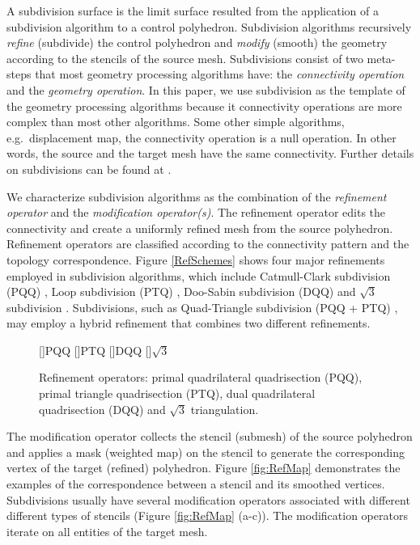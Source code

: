 A subdivision surface is the limit surface resulted from the
application of a subdivision algorithm to a control polyhedron.
Subdivision algorithms recursively \emph{refine} (subdivide) the
control polyhedron and \emph{modify} (smooth) the geometry according
to the stencils of the source mesh.  Subdivisions consist of two
meta-steps that most geometry processing algorithms have: the
\emph{connectivity operation} and the
\emph{geometry operation}. In this paper, we use subdivision
as the template of the geometry processing algorithms because it
connectivity operations are more complex than most other
algorithms. Some other simple algorithms, e.g.\ displacement map, the
connectivity operation is a null operation. In other words, the source
and the target mesh have the same connectivity.  Further details on
subdivisions can be found at \cite{siggraph1998notes}.


We characterize subdivision algorithms as the combination of the
\emph{refinement operator} and the \emph{modification operator(s)}. 
The refinement operator edits the connectivity and create a uniformly
refined mesh from the source polyhedron.  Refinement operators are
classified according to the connectivity pattern and the topology
correspondence.  Figure \ref{RefSchemes} shows four major refinements
employed in subdivision algorithms, which include Catmull-Clark
subdivision (PQQ) \cite{cc}, Loop subdivision (PTQ) \cite{loop},
Doo-Sabin subdivision (DQQ) \cite{ds} and $\sqrt{3}$ subdivision
\cite{sqrt3}. Subdivisions, such as Quad-Triangle subdivision (PQQ +
PTQ) \cite{qts,l-pg-03}, may employ a hybrid refinement that combines
two different refinements.

\begin{figure}
  \centering
  []{\scriptsize PQQ} 
  []{\scriptsize PTQ}
  []{\scriptsize DQQ} 
  []{\scriptsize $\sqrt{3}$} 
  \caption{Refinement operators: 
    primal quadrilateral quadrisection (PQQ),
    primal triangle quadrisection (PTQ),
    dual quadrilateral quadrisection (DQQ) and
    $\sqrt{3}$ triangulation.}
  \label{fig:RefSchemes}
\end{figure}

The modification operator collects the stencil (submesh) of the source
polyhedron and applies a mask (weighted map) on the stencil to
generate the corresponding vertex of the target (refined)
polyhedron. Figure \ref{fig:RefMap} demonstrates the examples of the
correspondence between a stencil and its smoothed
vertices. Subdivisions usually have several modification operators
associated with different different types of stencils (Figure
\ref{fig:RefMap} (a-c)).  The modification operators iterate on all
entities of the target mesh.

